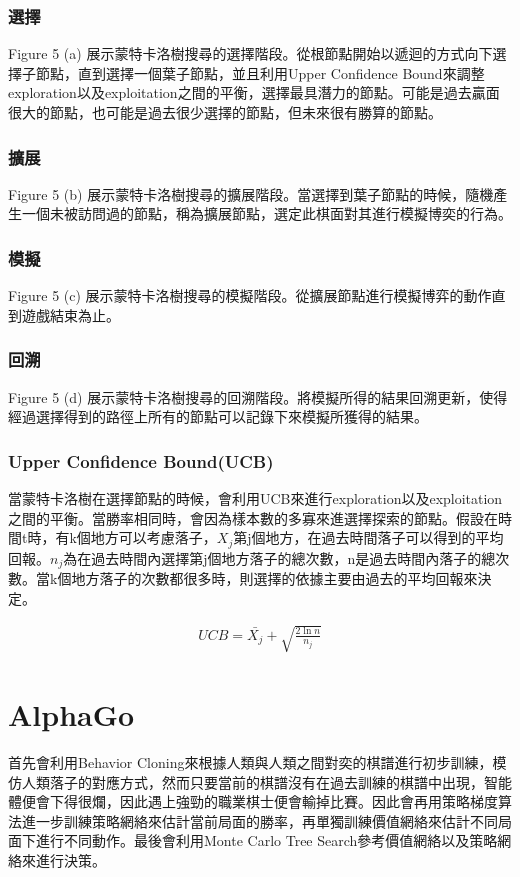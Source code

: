 \documentclass[a4paper,12pt]{article}
\begin{document}
\subsubsection{選擇}
\qquad Figure 5 (a) 展示蒙特卡洛樹搜尋的選擇階段。從根節點開始以遞迴的方式向下選擇子節點，直到選擇一個葉子節點，並且利用Upper Confidence Bound來調整exploration以及exploitation之間的平衡，選擇最具潛力的節點。可能是過去贏面很大的節點，也可能是過去很少選擇的節點，但未來很有勝算的節點。
\subsubsection{擴展}
\qquad Figure 5 (b) 展示蒙特卡洛樹搜尋的擴展階段。當選擇到葉子節點的時候，隨機產生一個未被訪問過的節點，稱為擴展節點，選定此棋面對其進行模擬博奕的行為。 
\subsubsection{模擬}
\qquad Figure 5 (c) 展示蒙特卡洛樹搜尋的模擬階段。從擴展節點進行模擬博弈的動作直到遊戲結束為止。
\subsubsection{回溯}
\qquad Figure 5 (d) 展示蒙特卡洛樹搜尋的回溯階段。將模擬所得的結果回溯更新，使得經過選擇得到的路徑上所有的節點可以記錄下來模擬所獲得的結果。

\subsubsection{Upper Confidence Bound(UCB)}
\qquad 當蒙特卡洛樹在選擇節點的時候，會利用UCB來進行exploration以及exploitation之間的平衡。當勝率相同時，會因為樣本數的多寡來進選擇探索的節點。假設在時間t時，有k個地方可以考慮落子，$X_{j}$第j個地方，在過去時間落子可以得到的平均回報。$n_{j}$為在過去時間內選擇第j個地方落子的總次數，n是過去時間內落子的總次數。當k個地方落子的次數都很多時，則選擇的依據主要由過去的平均回報來決定。

\begin{align}
&UCB=\bar{X_{j}}+\sqrt{\frac{2\ln n}{n_{j}}}&
\end{align}

\section{AlphaGo}
\qquad 首先會利用Behavior Cloning來根據人類與人類之間對奕的棋譜進行初步訓練，模仿人類落子的對應方式，然而只要當前的棋譜沒有在過去訓練的棋譜中出現，智能體便會下得很爛，因此遇上強勁的職業棋士便會輸掉比賽。因此會再用策略梯度算法進一步訓練策略網絡來估計當前局面的勝率，再單獨訓練價值網絡來估計不同局面下進行不同動作。最後會利用Monte Carlo Tree Search參考價值網絡以及策略網絡來進行決策。
\end{document}
